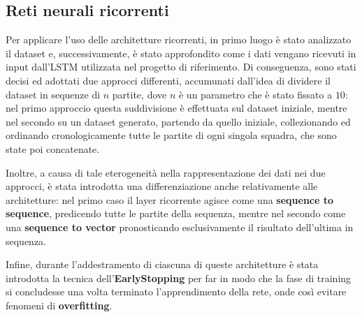 \subsection{Reti neurali ricorrenti}\label{sec:rnn}
Per applicare l'uso delle architetture ricorrenti, in primo luogo è stato analizzato il dataset e, successivamente, è stato approfondito come i dati vengano ricevuti in input dall'LSTM utilizzata nel progetto di riferimento. Di conseguenza, sono stati decisi ed adottati due approcci differenti, accumunati dall'idea di dividere il dataset in sequenze di $n$ partite, dove $n$ è un parametro che è stato fissato a $10$: nel primo approccio questa suddivisione è effettuata sul dataset iniziale, mentre nel secondo su un dataset generato, partendo da quello iniziale, collezionando ed ordinando cronologicamente tutte le partite di ogni singola squadra, che sono state poi concatenate.

Inoltre, a causa di tale eterogeneità nella rappresentazione dei dati nei due approcci, è stata introdotta una differenziazione anche relativamente alle architetture: nel primo caso il layer ricorrente agisce come una \textbf{sequence to sequence}, predicendo tutte le partite della sequenza, mentre nel secondo come una \textbf{sequence to vector} pronosticando esclusivamente il risultato dell'ultima in sequenza.

Infine, durante l'addestramento di ciascuna di queste architetture è stata introdotta la tecnica dell'\textbf{EarlyStopping} per far in modo che la fase di training si concludesse una volta terminato l'apprendimento della rete, onde così evitare fenomeni di \textbf{overfitting}.

